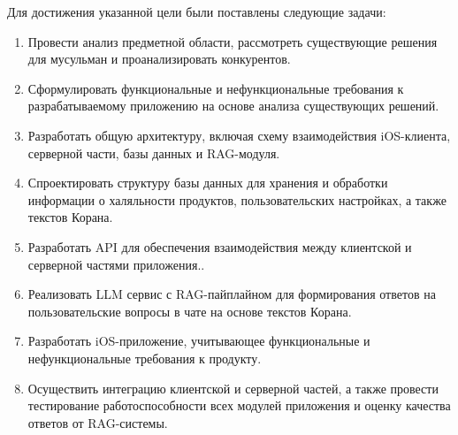 Для достижения указанной цели были поставлены следующие задачи:

\begin{enumerate}
	\item Провести анализ предметной области, рассмотреть существующие решения для мусульман и проанализировать конкурентов.
	\item Сформулировать функциональные и нефункциональные требования к разрабатываемому приложению на основе анализа существующих решений.
	\item Разработать общую архитектуру, включая схему взаимодействия iOS-клиента, серверной части, базы данных и RAG-модуля.
	\item Спроектировать структуру базы данных для хранения и обработки информации о халяльности продуктов, пользовательских настройках, а также текстов Корана.
	\item Разработать API для обеспечения взаимодействия между клиентской и серверной частями приложения..
	\item Реализовать LLM сервис с RAG-пайплайном для формирования ответов на пользовательские вопросы в чате на основе текстов Корана.
	\item Разработать iOS-приложение, учитывающее функциональные и нефункциональные требования к продукту.
	\item Осуществить интеграцию клиентской и серверной частей, а также провести тестирование работоспособности всех модулей приложения и оценку качества ответов от RAG-системы.
\end{enumerate}

